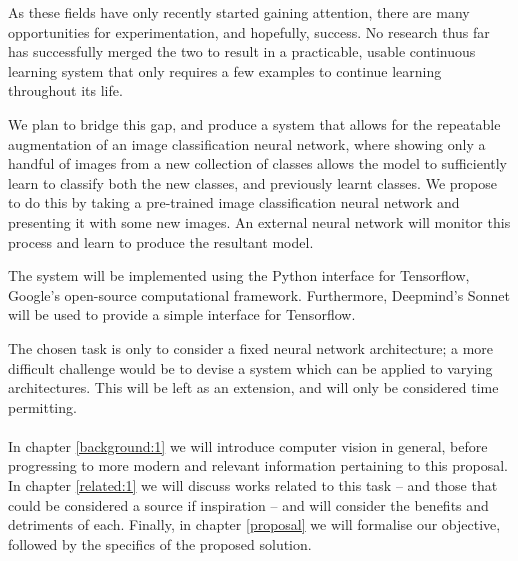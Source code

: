 \documentclass{report}
\begin{document}
	As these fields have only recently started gaining attention, there are many opportunities for experimentation, and hopefully, success. No research thus far has successfully merged the two to result in a practicable, usable continuous learning system that only requires a few examples to continue learning throughout its life. \par
	We plan to bridge this gap, and produce a system that allows for the repeatable augmentation of an image classification neural network, where showing only a handful of images from a new collection of classes allows the model to sufficiently learn to classify both the new classes, and previously learnt classes. We propose to do this by taking a pre-trained image classification neural network and presenting it with some new images. An external neural network will monitor this process and learn to produce the resultant model. \par
	The system will be implemented using the Python interface for Tensorflow\parencite{tensorflow}, Google's open-source computational framework. Furthermore, Deepmind's Sonnet\parencite{sonnet} will be used to provide a simple interface for Tensorflow. \par
	The chosen task is only to consider a fixed neural network architecture; a more difficult challenge would be to devise a system which can be applied to varying architectures. This will be left as an extension, and will only be considered time permitting. \\ \\
	In chapter \ref{background:1} we will introduce computer vision in general, before progressing to more modern and relevant information pertaining to this proposal. In chapter \ref{related:1} we will discuss works related to this task -- and those that could be considered a source if inspiration -- and will consider the benefits and detriments of each. Finally, in chapter \ref{proposal} we will formalise our objective, followed by the specifics of the proposed solution. \par
	
	
\end{document}
